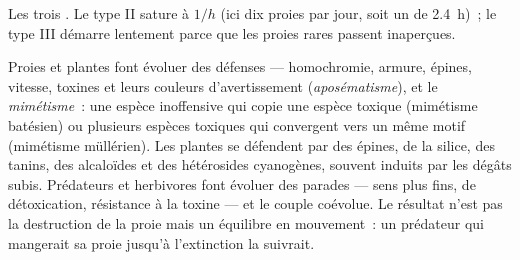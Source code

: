 \begin{omfigure}

{\small Les trois . Le type II sature à $1/h$
(ici dix proies par jour, soit un  de
\qty{2.4}{h})~; le type III démarre lentement parce que les proies rares
passent inaperçues.}
\end{omfigure}

\begin{proposition}\label{prop:b1:species-interactions:defences}
Proies et plantes font évoluer des défenses --- homochromie, armure,
épines, vitesse, toxines et leurs couleurs d'avertissement
(\emph{aposématisme}), et le \emph{mimétisme}~: une espèce inoffensive
qui copie une espèce toxique (mimétisme batésien) ou plusieurs espèces
toxiques qui convergent vers un même motif (mimétisme müllérien). Les
plantes se défendent par des épines, de la silice, des tanins, des
alcaloïdes et des hétérosides cyanogènes, souvent induits par les
dégâts subis. Prédateurs et herbivores font évoluer des parades --- sens
plus fins,  de détoxication, résistance à la toxine --- et le
couple coévolue. Le résultat n'est pas la destruction de la proie mais
un équilibre en mouvement~: un prédateur qui mangerait sa proie jusqu'à
l'extinction la suivrait.
\end{proposition}


